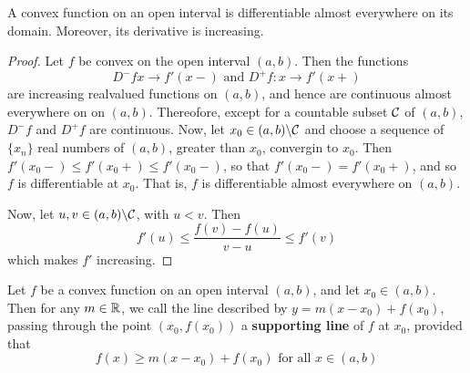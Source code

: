 \begin{theorem}\label{11.5.5}
    A convex function on an open interval is differentiable almost everywhere on
    its domain. Moreover, its derivative is increasing.
\end{theorem}
\begin{proof}
    Let $f$ be convex on the open interval $(a,b)$. Then the functions
    \begin{equation*}
        D^-{f}x \xrightarrow{} f'(x-) \text{ and } D^+{f}:x \xrightarrow{} f'(x+)
    \end{equation*}
    are increasing realvalued functions on $(a,b)$, and hence are continuous
    almost everywhere on on $(a,b)$. Thereofore, except for a countable subset
    $\mathcal{C}$ of $(a,b)$, $D^-{f}$ and $D^+{f}$ are continuous. Now, let $x_0 \in
    (a,b) \backslash \mathcal{C}$ and choose a sequence of $\{x_n\}$ real numbers of
    $(a,b)$, greater than $x_0$, convergin to $x_0$. Then $f'(x_0-) \leq
    f'(x_0+) \leq f'(x_0-)$, so that $f'(x_0-)=f'(x_0+)$, and so $f$ is
    differentiable at $x_0$. That is, $f$ is differentiable almost everywhere on
     $(a,b)$.

     Now, let $u,v \in (a,b) \backslash \mathcal{C}$, with $u<v$. Then
     \begin{equation*}
         f'(u) \leq \frac{f(v)-f(u)}{v-u} \leq f'(v)
     \end{equation*}
     which makes $f'$ increasing.
\end{proof}

\begin{definition}
    Let $f$ be a convex function on an open interval $(a,b)$, and let $x_0 \in
    (a,b)$. Then for any $m \in \mathbb{R}$, we call the line described by
    $y=m(x-x_0)+f(x_0)$, passing through the point $(x_0,f(x_0))$ a
    \textbf{supporting line} of $f$ at $x_0$, provided that
    \begin{equation*}
        f(x) \geq m(x-x_0)+f(x_0) \text{ for all } x \in (a,b)
    \end{equation*}
\end{definition}

